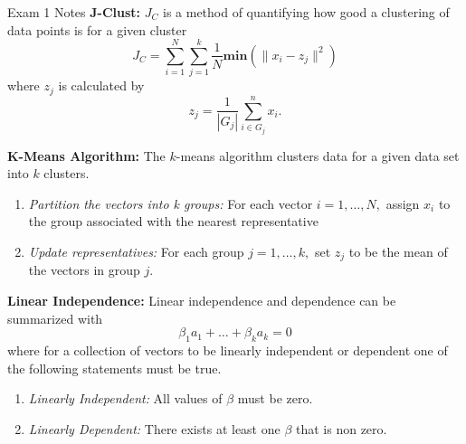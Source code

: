 \begin{cheatsheet}{Exam 1 Notes}
    \textbf{J-Clust:} $J_{C}$ is a method of quantifying how good a clustering of data points is for a given cluster
    \begin{equation*}
        J_{C} = \sum_{i = 1}^{N}\sum_{j = 1}^{k} \frac{1}{N} \mathbf{min}(\|x_{i} - z_{j}\|^{2})
    \end{equation*}
    where $z_{j}$ is calculated by 
    \begin{equation*}
        z_{j} = \frac{1}{|G_{j}|} \sum_{i \in G_{j}}^{n} x_{i}.
    \end{equation*}

    \textbf{K-Means Algorithm:} The $k$-means algorithm clusters data for a given data set into $k$ clusters.
    \begin{enumerate}
        \item \textit{Partition the vectors into k groups:} For each vector $i = 1, \dots, N,$ assign $x_{i}$ to the group associated with the nearest representative
        \item \textit{Update representatives:} For each group $j = 1, \dots, k,$ set $z_{j}$ to be the mean of the vectors in group $j$.
    \end{enumerate}

    \textbf{Linear Independence:} Linear independence and dependence can be summarized with
    \begin{equation*}
        \beta_{1}a_{1} + \dots + \beta_{k}a_{k} = 0
    \end{equation*}
    where for a collection of vectors to be linearly independent or dependent one of the following statements must be true.
    \begin{enumerate}
        \item \textit{Linearly Independent:} All values of $\beta$ must be zero.
        \item \textit{Linearly Dependent:} There exists at least one $\beta$ that is non zero.
    \end{enumerate}
\end{cheatsheet}

